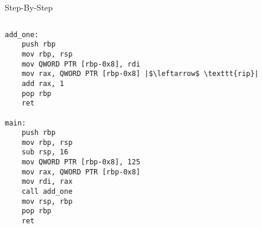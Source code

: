 \documentclass[hyphens,aspectratio=169]{beamer}
\begin{document}
\begin{frame}[fragile]{Step-By-Step}
    \begin{columns}
        \begin{column}{0.33\textwidth}
            \begin{verbatim}
add_one:
    push rbp
    mov rbp, rsp
    mov QWORD PTR [rbp-0x8], rdi
    mov rax, QWORD PTR [rbp-0x8] |$\leftarrow$ \texttt{rip}|
    add rax, 1
    pop rbp
    ret

main:
    push rbp
    mov rbp, rsp
    sub rsp, 16
    mov QWORD PTR [rbp-0x8], 125
    mov rax, QWORD PTR [rbp-0x8]
    mov rdi, rax
    call add_one
    mov rsp, rbp
    pop rbp
    ret
            \end{verbatim}
        \end{column}
        \begin{column}{0.33\textwidth}
\end{column}
\end{columns}
\end{frame}
\end{document}
